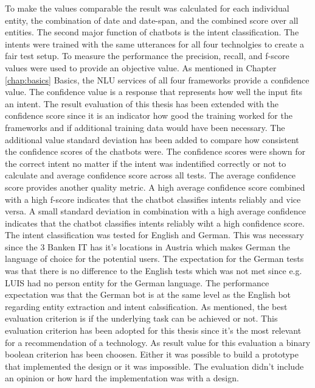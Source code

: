 To make the values comparable the result was calculated for each individual entity, the combination of date and date-span, 
and the combined score over all entities.
The second major function of chatbots is the intent classification.
The intents were trained with the same utterances for all four technolgies 
to create a fair test setup.
To measure the performance the precision, recall, and f-score values were used to 
provide an objective value.
As mentioned in Chapter \ref{chap:basics} Basics, the NLU services of all four 
frameworks provide a confidence value.
The confidence value is a response that represents how well the input fits an intent.
The result evaluation of this thesis has been extended with the confidence score since 
it is an indicator how good the training worked for the frameworks and if 
additional training data would have been necessary.
The additional value standard deviation has been added to compare how consistent the 
confidence scores of the chatbots were. 
The confidence scores were shown for the correct intent no matter if the intent 
was indentified correctly or not to calculate and average confidence 
score across all tests.
The average confidence score provides another quality metric.
A high average confidence score combined with a high f-score indicates that the 
chatbot classifies intents reliably and vice versa.
A small standard deviation in combination with a high average confidence indicates
that the chatbot classifies intents reliably wiht a high confidence score. 
The intent classification was tested for English and German.
This was necessary since the 3 Banken IT has it's locations in Austria
which makes German the language of choice for the potential users.
The expectation for the German tests was that there is no difference to the 
English tests which was not met since e.g. LUIS had no person entity for 
the German language.
The performance expectation was that the German bot is at the same level 
as the English bot regarding entity extraction and intent calssification.
As \citet{singhbuilding} mentioned, the best evaluation criterion is if the 
underlying task can be achieved or not.
This evaluation criterion has been adopted for this thesis since it's the 
most relevant for a recommendation of a technology.
As result value for this evaluation a binary boolean criterion has been choosen.
Either it was possible to build a prototype that implemented the design or it was impossible.
The evaluation didn't include an opinion or how hard the implementation was with a design.
